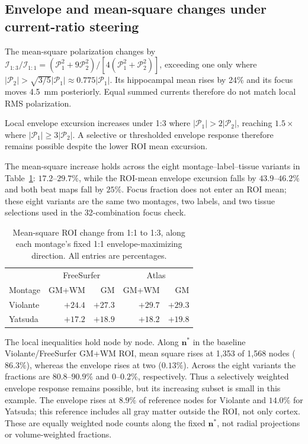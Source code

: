 \subsection{Envelope and mean-square changes under current-ratio steering}\label{supp:steering-algebra}
The mean-square polarization
changes by $\mathcal I_{1:3}/\mathcal I_{1:1}
=(\mathcal P_1^2+9\mathcal P_2^2)/[4(\mathcal P_1^2+\mathcal P_2^2)]$,
exceeding one only where $|\mathcal P_2|>\sqrt{3/5}|\mathcal P_1|
\approx0.775|\mathcal P_1|$. Its hippocampal mean rises by 24\% and its focus
moves 4.5~mm posteriorly. Equal summed currents therefore do not match local
RMS polarization.

Local envelope excursion increases under 1:3 where
$|\mathcal P_1|>2|\mathcal P_2|$, reaching $1.5\times$ where
$|\mathcal P_1|\geq3|\mathcal P_2|$. A selective or thresholded envelope
response therefore remains possible despite the lower ROI mean excursion.


The mean-square increase holds across the eight montage--label--tissue
variants in Table~\ref{tab:fem-mean-variants}: $17.2$--$29.7\%$, while the
ROI-mean envelope excursion falls by $43.9$--$46.2\%$ and both beat maps fall by $25\%$.
Focus fraction does not enter an ROI mean; these eight variants are the
same two montages, two labels, and two tissue selections used in the
32-combination focus check.

\begin{table}[htbp]\centering\small
\caption{Mean-square ROI change from 1:1 to 1:3, along each montage's fixed
1:1 envelope-maximizing direction. All entries are percentages.}
\label{tab:fem-mean-variants}
\begin{tabular}{@{}lrrrr@{}}
\toprule
& \multicolumn{2}{c}{FreeSurfer} & \multicolumn{2}{c}{Atlas}\\
Montage & GM+WM & GM & GM+WM & GM\\
\midrule
Violante & $+24.4$ & $+27.3$ & $+29.7$ & $+29.3$\\
Yatsuda & $+17.2$ & $+18.9$ & $+18.2$ & $+19.8$\\
\bottomrule
\end{tabular}
\end{table}

The local inequalities hold node by node. Along $\mathbf n^*$ in the
baseline Violante/FreeSurfer GM+WM ROI, mean square rises at 1,353 of 1,568
nodes ($86.3\%$), whereas the envelope rises at two ($0.13\%$). Across the
eight variants the fractions are $80.8$--$90.9\%$ and $0$--$0.2\%$,
respectively. Thus a selectively weighted envelope response remains possible,
but its increasing subset is small in this example. The envelope rises at
$8.9\%$ of reference nodes for Violante and $14.0\%$ for Yatsuda; this
reference includes all gray matter outside the ROI, not only cortex.
These are equally weighted node counts along the fixed $\mathbf n^*$,
not radial projections or volume-weighted fractions.
